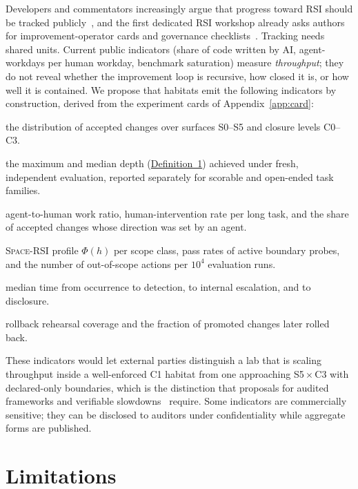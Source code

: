 \documentclass[11pt,a4paper]{article}
\newcommand{\SpaceRSI}{\textsc{Space-RSI}}
\begin{document}
Developers and commentators increasingly argue that progress toward RSI should be tracked publicly~\cite{openai-accel,anthropic-rsi}, and the first dedicated RSI workshop already asks authors for improvement-operator cards and governance checklists~\cite{iclr-ws}. Tracking needs shared units. Current public indicators (share of code written by AI, agent-workdays per human workday, benchmark saturation) measure \emph{throughput}; they do not reveal whether the improvement loop is recursive, how closed it is, or how well it is contained. We propose that habitats emit the following indicators by construction, derived from the experiment cards of Appendix~\ref{app:card}:
\begin{description}[leftmargin=0pt,font=\normalfont\bfseries]
\item[(R1) Loop position:] the distribution of accepted changes over surfaces S0--S5 and closure levels C0--C3.
\item[(R2) Recursive depth:] the maximum and median depth (\hyperref[def:rsi]{Definition~1}) achieved under fresh, independent evaluation, reported separately for scorable and open-ended task families.
\item[(R3) Human role:] agent-to-human work ratio, human-intervention rate per long task, and the share of accepted changes whose direction was set by an agent.
\item[(R4) Containment:] \SpaceRSI{} profile $\Phi(h)$ per scope class, pass rates of active boundary probes, and the number of out-of-scope actions per $10^4$ evaluation runs.
\item[(R5) Incident clock:] median time from occurrence to detection, to internal escalation, and to disclosure.
\item[(R6) Reversibility:] rollback rehearsal coverage and the fraction of promoted changes later rolled back.
\end{description}
These indicators would let external parties distinguish a lab that is scaling throughput inside a well-enforced C1 habitat from one approaching S5\,$\times$\,C3 with declared-only boundaries, which is the distinction that proposals for audited frameworks and verifiable slowdowns~\cite{pachocki,anthropic-rsi} require. Some indicators are commercially sensitive; they can be disclosed to auditors under confidentiality while aggregate forms are published.

\section{Limitations}
\end{document}
